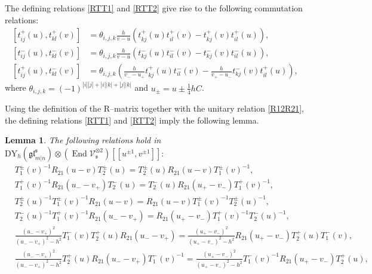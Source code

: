 \documentclass[a4paper,12pt]{article}
\newtheorem{lemm}[theo]{Lemma}
\numberwithin{equation}{section}
\begin{document}
The defining relations \eqref{RTT1} and \eqref{RTT2} give rise to the following commutation relations:
\begin{align}\label{Y1}
\left[t_{ij}^{+}(u),t_{kl}^{+}(v)\right]&=\theta_{i,j,k}\frac{h}{v-u}\left(t_{kj}^{+}(u)t_{il}^{+}(v)-t_{kj}^{+}(v)t_{il}^{+}(u)\right),\\ \label{Y2}
\left[t_{ij}^{-}(u),t_{kl}^{-}(v)\right]&=\theta_{i,j,k}\frac{h}{v-u}\left(t_{kj}^{-}(u)t_{il}^{-}(v)-t_{kj}^{-}(v)t_{il}^{-}(u)\right),\\ \label{Y3}
\left[t_{ij}^{+}(u),t_{kl}^{-}(v)\right]&=\theta_{i,j,k}\left(
\frac{h}{v_{-}-u_{+}}t_{kj}^{+}(u)t_{il}^{-}(v)-\frac{h}{v_{+}-u_{-}}t_{kj}^{-}(v)t_{il}^{+}(u)\right),
\end{align}
where $\theta_{i,j,k}=(-1)^{|i||j|+|i||k|+
|j||k|}$ and  $u_{\pm}=u\pm\frac{1}{4}hC$.

Using the definition of the R--matrix together with the unitary relation \eqref{R12R21}, the defining relations \eqref{RTT1} and \eqref{RTT2} imply the following lemma.

\begin{lemm}
    The following relations hold in $\mathrm{DY}_{h}(\mathfrak{gl}_{m|n}^{\mathfrak{s}})\otimes
(\operatorname{End}\mathcal{V}_{\mathfrak{s}}^{\otimes 2})[[u^{\pm 1},v^{\pm 1}]]:$ 
    \begin{align}\label{RTT4}
&T_{1}^{\pm}(v)^{-1}R_{21}(u-v) T_{2}^{\pm}(u)=T_{2}^{\pm}(u)R_{21}(u-v)T_{1}^{\pm}(v)^{-1},\\ \label{RTT5}
&T_{1}^{+}(v)^{-1}R_{21}(u_{-}-v_{+}) T_{2}^{-}(u)=T_{2}^{-}(u)R_{21}(u_{+}-v_{-})T_{1}^{+}(v)^{-1},\\ \label{RTT6}
&T_{2}^{\pm}(u)^{-1}T_{1}^{\pm}(v)^{-1}R_{21}(u-v)=
R_{21}(u-v)T_{1}^{\pm}(v)^{-1}T_{2}^{\pm}(u)^{-1},\\ \label{RTT7}
&T_{2}^{-}(u)^{-1}T_{1}^{+}(v)^{-1}R_{21}(u_{-}-v_{+})
=R_{21}(u_{+}-v_{-})T_{1}^{+}(v)^{-1}T_{2}^{-}(u)^{-1},\\ \label{RTT8}
&\frac{(u_{-}-v_{+})^{2}}{(u_{-}-v_{+})^{2}-h^{2}}T_{1}^{-}(v)T_{2}^{+}(u) R_{21}(u_{-}-v_{+})
=\frac{(u_{+}-v_{-})^{2}}{(u_{+}-v_{-})^{2}-h^{2}}R_{21}(u_{+}-v_{-})
T_{2}^{+}(u)T_{1}^{-}(v),\\  \label{RTT9}
&\frac{(u_{-}-v_{+})^{2}}{(u_{-}-v_{+})^{2}-h^{2}}T_{2}^{+}(u)R_{21}(u_{-}-v_{+})T_{1}^{-}(v)^{-1}
=\frac{(u_{+}-v_{-})^{2}}{(u_{+}-v_{-})^{2}-h^{2}}T_{1}^{-}(v)^{-1}R_{21}(u_{+}-v_{-})T_{2}^{+}(u),
\end{align}
\end{lemm}
\end{document}
